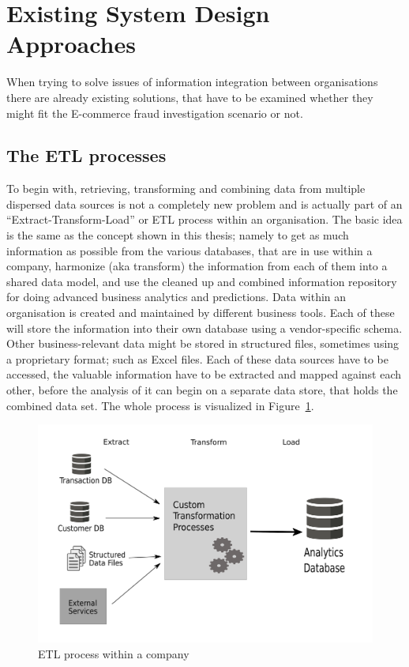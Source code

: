 
\section{Existing System Design Approaches}
\label{sec:system_approaches}

When trying to solve issues of information integration between organisations there are already existing solutions, that have to be examined whether they might fit the E-commerce fraud investigation scenario or not.

\subsection{The \gls{ETL} processes}
\label{subsec:etl_process}

To begin with, retrieving, transforming and combining data from multiple dispersed data sources is not a completely new problem and is actually part of an ``Extract-Transform-Load'' or \gls{ETL} process within an organisation. The basic idea is the same as the concept shown in this thesis; namely to get as much information as possible from the various databases, that are in use within a company, harmonize (aka transform) the information from each of them into a shared data model, and use the cleaned up and combined information repository for doing advanced business analytics and predictions. Data within an organisation is created and maintained by different business tools. Each of these will store the information into their own database using a vendor-specific schema. Other business-relevant data might be stored in structured files, sometimes using a proprietary format; such as Excel files. Each of these data sources have to be accessed, the valuable information have to be extracted and mapped against each other, before the analysis of it can begin on a separate data store, that holds the combined data set. The whole process is visualized in Figure~\ref{fig:images_etl_process}. \\

\begin{figure}[!ht]
  \centering
  \includegraphics[width=0.7\columnwidth]{images/etl_process.pdf}
  \caption{\gls{ETL} process within a company \citep[pg. 165]{wood2014linked}}
\label{fig:images_etl_process}
\end{figure}

